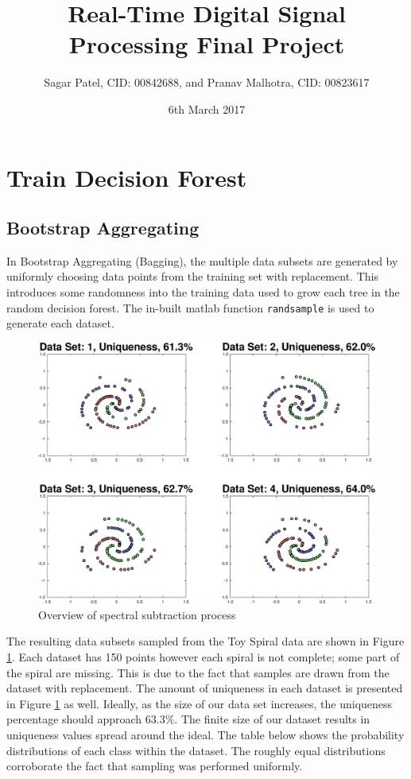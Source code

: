 \documentclass[a4paper,pra,twocolumn,10pt,aps,longbibliography,nobalancelastpage]{revtex4-1}
\begin{document}
\title{Real-Time Digital Signal Processing Final Project}
\author{Sagar Patel, CID: 00842688, and Pranav Malhotra, CID: 00823617}
\date{6th March 2017}

\maketitle
\section{Train Decision Forest}

\subsection{Bootstrap Aggregating}
In Bootstrap Aggregating (Bagging), the multiple data subsets are generated by uniformly choosing data points from the training set with replacement. This introduces some randomness into the
training data used to grow each tree in the random decision forest. The in-built matlab function \texttt{randsample} is used to generate each dataset. 
\begin{figure}[H]
	\centering
    \includegraphics[width=0.60\columnwidth]{boot_strap}
    \caption{Overview of spectral subtraction process}
    \label{fig:boot_strap}
\end{figure}

The resulting data subsets sampled from the Toy Spiral data are shown in Figure \ref{fig:boot_strap}. Each dataset has 150 points however each spiral is not complete; some part of the spiral are missing. This is due to the fact that samples are drawn from the dataset with replacement. The amount of uniqueness in each dataset is presented in Figure \ref{fig:boot_strap} as well.  Ideally, as the size of our data set increases, the uniqueness percentage should approach $63.3\%$. The finite size of our dataset results in uniqueness values spread around the ideal. The table below shows the probability distributions of each class within the dataset. The roughly equal distributions corroborate the fact that sampling was performed uniformly.
\end{document}
